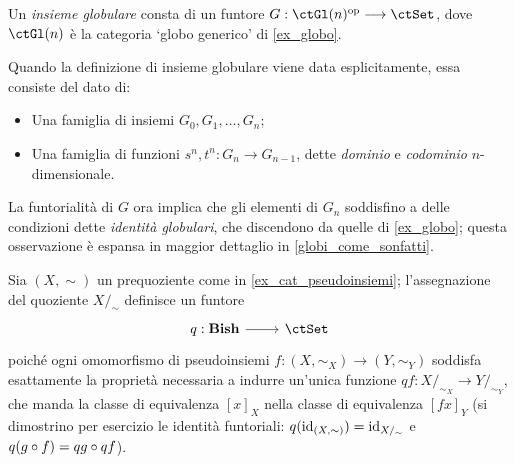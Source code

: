\begin{definition}\label{def_insieme_globulare}
	Un \emph{insieme globulare} consta di un funtore \(G : \ctGl(n)^\op\fun\ctSet\), dove \(\ctGl(n)\) è la categoria `globo generico' di \ref{ex_globo}.

	Quando la definizione di insieme globulare viene data esplicitamente, essa consiste del dato di:
	\begin{itemize}
		\item Una famiglia di insiemi \(G_0,G_1,\dots,G_n\);
		\item Una famiglia di funzioni \(s^n,t^n : G_n\to G_{n-1}\), dette \emph{dominio} e \emph{codominio} \(n\)-dimensionale.
	\end{itemize}
	La funtorialità di \(G\) ora implica che gli elementi di \(G_n\) soddisfino a delle condizioni dette \emph{identità globulari}, che discendono da quelle di \ref{ex_globo}; questa osservazione è espansa in maggior dettaglio in \ref{globi_come_sonfatti}.
\end{definition}
\begin{example}
	Sia \((X,\sim)\) un prequoziente come in \ref{ex_cat_pseudoinsiemi}; l'assegnazione del quoziente \(X/_\sim\) definisce un funtore
	\[\dmFun q{\cate{Bish}}{\ctSet}\]
	poiché ogni omomorfismo di pseudoinsiemi \(f : (X,\sim_X)\to (Y,\sim_Y)\) soddisfa esattamente la proprietà necessaria a indurre un'unica funzione \(qf : X/_{\sim_X}\to Y/_{\sim_Y}\), che manda la classe di equivalenza \([x]_X\) nella classe di equivalenza \([fx]_Y\) (si dimostrino per esercizio le identità funtoriali: \(q(\mathrm{id}_{(X,\sim)})=\mathrm{id}_{X/_\sim}\) e \(q(g\circ f)=qg\circ qf\)).
\end{example}
